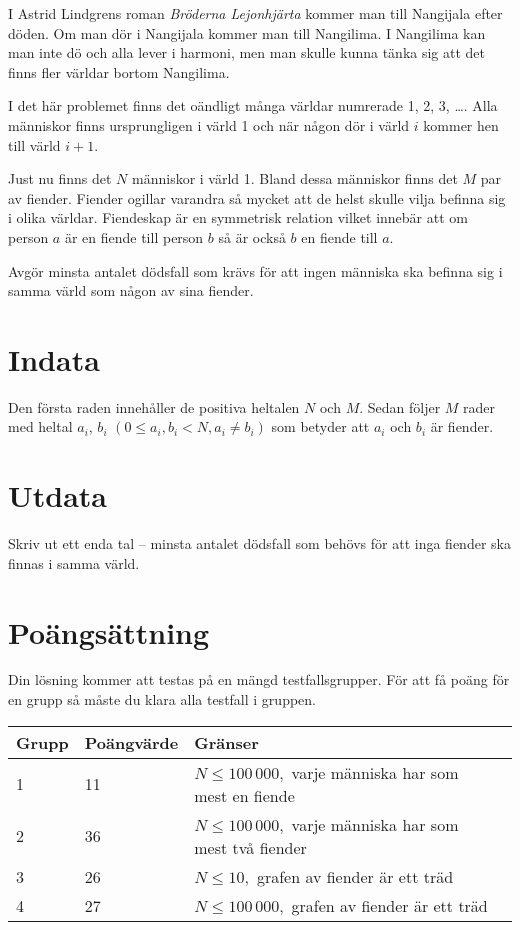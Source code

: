 \def\version{1}
I Astrid Lindgrens roman \emph{Bröderna Lejonhjärta} kommer man till Nangijala efter döden. Om man dör i Nangijala kommer man till Nangilima. I Nangilima kan man inte dö och alla lever i harmoni, men man skulle kunna tänka sig att det finns fler världar bortom Nangilima.

I det här problemet finns det oändligt många världar numrerade 1, 2, 3, \dots. Alla människor finns ursprungligen i värld 1 och när någon dör i värld $i$ kommer hen till värld $i+1$.

Just nu finns det $N$ människor i värld 1. Bland dessa människor finns det $M$ par av fiender. Fiender ogillar varandra så mycket att de helst skulle vilja befinna sig i olika världar. Fiendeskap är en symmetrisk relation vilket innebär att om person $a$ är en fiende till person $b$ så är också $b$ en fiende till $a$.

Avgör minsta antalet dödsfall som krävs för att ingen människa ska befinna sig i samma värld som någon av sina fiender.

\section*{Indata}
Den första raden innehåller de positiva heltalen $N$ och $M$.
Sedan följer $M$ rader med heltal $a_i$, $b_i$ $(0 \le a_i, b_i < N, a_i \neq b_i)$ som betyder att $a_i$ och $b_i$ är fiender.

\section*{Utdata}
Skriv ut ett enda tal -- minsta antalet dödsfall som behövs för att inga fiender ska finnas i samma värld.

\section*{Poängsättning}
Din lösning kommer att testas på en mängd testfallsgrupper. För att få poäng för en grupp
så måste du klara alla testfall i gruppen.

\noindent
\begin{tabular}{| l | l | l | l |}
\hline
Grupp & Poängvärde & Gränser \\ \hline
	1     & 11 & $N \le 100\,000,$ varje människa har som mest en fiende \\ \hline
	2     & 36 & $N \le 100\,000,$ varje människa har som mest två fiender  \\ \hline
	3     & 26 & $N \le 10,$ grafen av fiender är ett träd \\ \hline
	4     & 27 & $N \le 100\,000,$ grafen av fiender är ett träd \\ \hline
\end{tabular}
